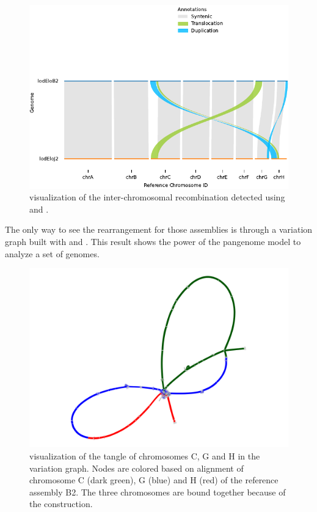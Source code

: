\begin{figure}[h!]
	\centering
	\includegraphics[width=.8\linewidth]{figures/lodelo/plotsr.pdf}
	\caption[Linear reference visualization of the \lodelo inter-chromosomal recombination.]{\plotsr visualization of the inter-chromosomal recombination detected using \wfmash and \syri.}
	\label{fig:plotsr_synteny}
\end{figure}
The only way to see the rearrangement for those assemblies is through a variation graph built with \pggb and \mcactus. This result shows the power of the pangenome model to analyze a set of genomes.
\begin{figure}[h!]
	\centering
	\includegraphics[width=.8\linewidth]{figures/lodelo/tangle_chrCGH_B2_Cgreen_Gblue_Hred.png}
	\caption[Visualization of chromosomes tangle in the \mcactus variation graph.]{ \bandage visualization of the tangle of chromosomes C, G and H in the \mcactus variation graph. Nodes are colored based on \minigraph alignment of chromosome C (dark green), G (blue) and H (red) of the reference assembly B2. The three chromosomes are bound together because of the construction.}
	\label{fig:lodelo_graph_tangle}
\end{figure}

